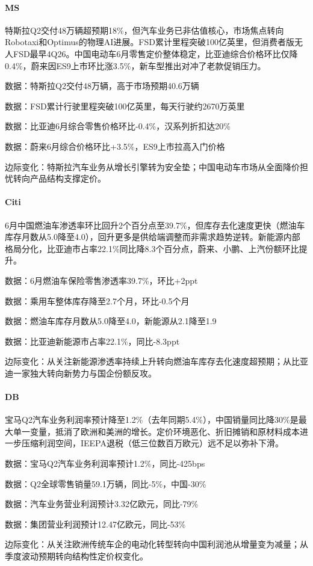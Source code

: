 \documentclass[11pt]{ctexart}
\begin{document}
\paragraph{MS} 特斯拉Q2交付48万辆超预期18\%，但汽车业务已非估值核心，市场焦点转向Robotaxi和Optimus的物理AI进展。FSD累计里程突破100亿英里，但消费者版无人FSD最早4Q26。中国电动车6月零售定价整体稳定，比亚迪综合价格环比仅降0.4\%，蔚来因ES9上市环比涨3.5\%，新车型推出对冲了老款促销压力。
{\small\color{refgray}数据：特斯拉Q2交付48万辆，高于市场预期40.6万辆\par}
{\small\color{refgray}数据：FSD累计行驶里程突破100亿英里，每天行驶约2670万英里\par}
{\small\color{refgray}数据：比亚迪6月综合零售价格环比-0.4\%，汉系列折扣达20\%\par}
{\small\color{refgray}数据：蔚来6月综合价格环比+3.5\%，ES9上市拉高入门价格\par}
{\small\color{refgray}边际变化：特斯拉汽车业务从增长引擎转为安全垫；中国电动车市场从全面降价担忧转向产品结构支撑定价。\par}
\paragraph{Citi} 6月中国燃油车渗透率环比回升2个百分点至39.7\%，但库存去化速度更快（燃油车库存月数从5.0降至4.0），回升更多是供给端调整而非需求趋势逆转。新能源内部格局分化，比亚迪市占率22.1\%同比降8.3个百分点，蔚来、小鹏、上汽份额环比提升。
{\small\color{refgray}数据：6月燃油车保险零售渗透率39.7\%，环比+2ppt\par}
{\small\color{refgray}数据：乘用车整体库存降至2.7个月，环比-0.5个月\par}
{\small\color{refgray}数据：燃油车库存月数从5.0降至4.0，新能源从2.1降至1.9\par}
{\small\color{refgray}数据：比亚迪新能源市占率22.1\%，同比-8.3ppt\par}
{\small\color{refgray}边际变化：从关注新能源渗透率持续上升转向燃油车库存去化速度超预期；从比亚迪一家独大转向新势力与国企份额反攻。\par}
\paragraph{DB} 宝马Q2汽车业务利润率预计降至1.2\%（去年同期5.4\%），中国销量同比降30\%是最大单一变量，抵消了欧洲和美洲的增长。定价环境恶化、折旧摊销和原材料成本进一步压缩利润空间，IEEPA退税（低三位数百万欧元）远不足以弥补下滑。
{\small\color{refgray}数据：宝马Q2汽车业务利润率预计1.2\%，同比-425bps\par}
{\small\color{refgray}数据：Q2全球零售销量59.1万辆，同比-5\%，中国-30\%\par}
{\small\color{refgray}数据：汽车业务营业利润预计3.32亿欧元，同比-79\%\par}
{\small\color{refgray}数据：集团营业利润预计12.47亿欧元，同比-53\%\par}
{\small\color{refgray}边际变化：从关注欧洲传统车企的电动化转型转向中国利润池从增量变为减量；从季度波动预期转向结构性定价权变化。\par}
\end{document}
